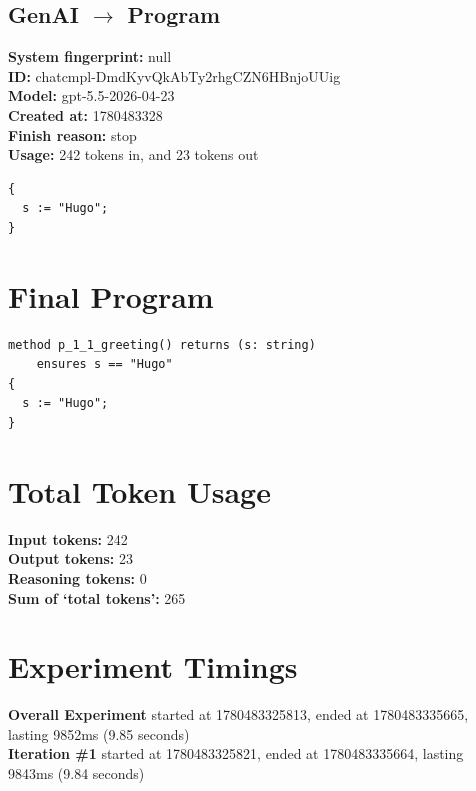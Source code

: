 \documentclass{article}
\begin{document}
\subsection*{GenAI $\rightarrow$ Program}
\textbf{System fingerprint: }null
\\\textbf{ID: }chatcmpl-DmdKyvQkAbTy2rhgCZN6HBnjoUUig
\\\textbf{Model: }gpt-5.5-2026-04-23
\\\textbf{Created at: }1780483328
\\\textbf{Finish reason: }stop
\\\textbf{Usage: }242 tokens in, and 23 tokens out
\begin{lstlisting}
{
  s := "Hugo";
}
\end{lstlisting}
\section*{Final Program}
\begin{lstlisting}
method p_1_1_greeting() returns (s: string)
	ensures s == "Hugo"
{
  s := "Hugo";
}
\end{lstlisting}
\section*{Total Token Usage}
\textbf{Input tokens: }242
\\\textbf{Output tokens: }23
\\\textbf{Reasoning tokens: }0
\\\textbf{Sum of `total tokens': }265
\section*{Experiment Timings}
\textbf{Overall Experiment} started at 1780483325813, ended at 1780483335665, lasting 9852ms (9.85 seconds)
\\\textbf{Iteration \#1} started at 1780483325821, ended at 1780483335664, lasting 9843ms (9.84 seconds)
\end{document}
